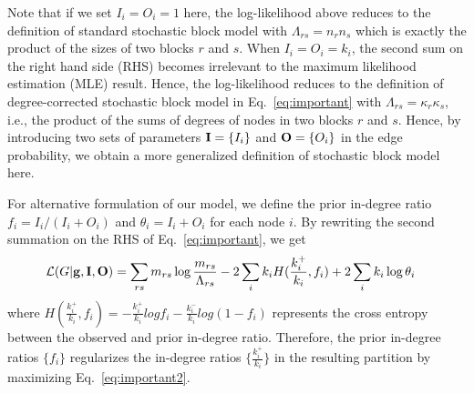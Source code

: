 Note that if we set $I_i = O_i = 1$ here, the log-likelihood above reduces to the definition of standard stochastic block model with $\Lambda_{rs} = n_r n_s$ which is exactly the product of the sizes of two blocks $r$ and $s$. When $I_i = O_i = k_i$, the second sum on the right hand side (RHS) becomes irrelevant to the maximum likelihood estimation (MLE) result. Hence, the log-likelihood reduces to the definition of degree-corrected stochastic block model in Eq.~\ref{eq:important} with $\Lambda_{rs} = \kappa_r \kappa_s$, i.e., the product of the sums of degrees of nodes in two blocks $r$ and $s$. Hence, by introducing two sets of parameters ${\bf I} = \{I_i\}$ and ${\bf O} = \{O_i\}$ in the edge probability, we obtain a more generalized definition of stochastic block model here.

For alternative formulation of our model, we define the prior in-degree ratio $f_i = I_i / (I_i + O_i)$ and $\theta_i = I_i + O_i$ for each node $i$. By rewriting the second summation on the RHS of Eq.~\ref{eq:important}, we get 
\begin{align} \label{eq:important2}
    \mathcal{L}(G|{\bf g,I,O})
    &=  \sum_{rs} m_{rs} \log \frac{m_{rs}}{\Lambda_{rs}} - 2\sum_i k_i H(\frac{k_i^+}{k_i},f_i) + 2 \sum_i k_i \log \theta_i
\end{align}
where $H(\frac{k_i^+}{k_i},f_i) = -\frac{k_i^+}{k_i} log f_i - \frac{k_i^-}{k_i} log (1 - f_i)$ represents the cross entropy between the observed and prior in-degree ratio. Therefore, the prior in-degree ratios $\{f_i\}$ regularizes the in-degree ratios $\{\frac{k_i^+}{k_i}\}$ in the resulting partition by maximizing Eq.~\ref{eq:important2}.

